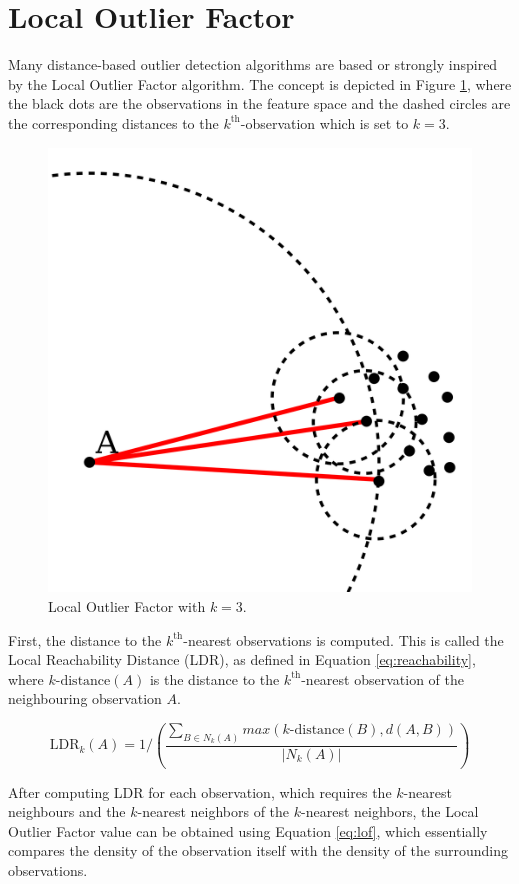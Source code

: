 \section{Local Outlier Factor \label{sec:lof}}

Many distance-based outlier detection algorithms are based or strongly inspired by the Local Outlier Factor algorithm. The concept is depicted in Figure \ref{fig:lof}, where the black dots are the observations in the feature space and the dashed circles are the corresponding distances to the $k^{\text{th}}$-observation which is set to $k=3$.

\begin{figure}[ht!]
\centering
\includegraphics[width=.6\textwidth]{figures/lof.png}
\caption{Local Outlier Factor with $k=3$. \label{fig:lof}}
\end{figure}

First, the distance to the $k^{\text{th}}$-nearest observations is computed. This is called the Local Reachability Distance (LDR), as defined in Equation \ref{eq:reachability}, where $k\text{-distance}(A)$ is the distance to the $k^{\text{th}}$-nearest observation of the neighbouring observation $A$. 

\begin{equation}
\text{LDR}_{k}(A) = 1 / \left( \frac{\sum_{B \in N_{k}(A)} max(k\text{-distance}(B), d(A,B))}{|N_{k}(A)|} \right) \label{eq:reachability}
\end{equation}

After computing LDR for each observation, which requires the $k$-nearest neighbours and the $k$-nearest neighbors of the $k$-nearest neighbors, the Local Outlier Factor value can be obtained using Equation \ref{eq:lof}, which essentially compares the density of the observation itself with the density of the surrounding observations.

